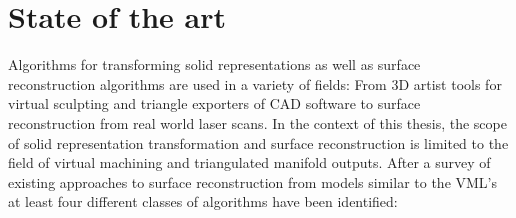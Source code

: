 
\chapter{State of the art}
\label{ch:state_of_the_art}

Algorithms for transforming solid representations as well as surface reconstruction algorithms are used in a variety of fields:
From 3D artist tools for virtual sculpting and triangle exporters of CAD software to surface reconstruction from real world laser scans.
In the context of this thesis, the scope of solid representation transformation and surface reconstruction is limited to the field of virtual machining and triangulated manifold outputs.
After a survey of existing approaches to surface reconstruction from models similar to the VML's at least four different classes of algorithms have been identified:

